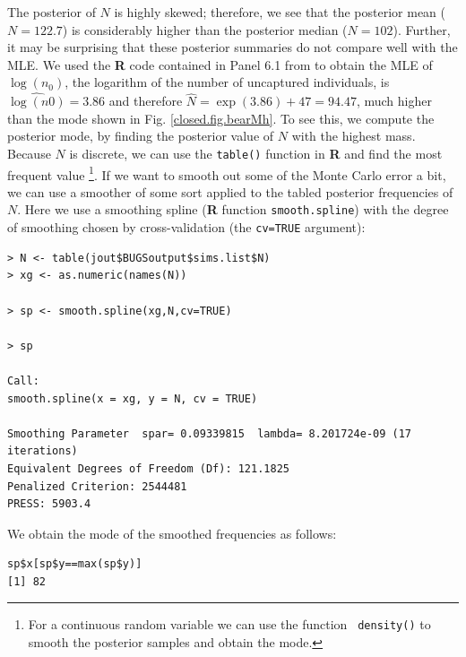 The posterior of $N$ is highly skewed; therefore, we see that the
posterior mean
($N=122.7$) is considerably higher than the posterior median
($N=102$).
Further, it may be surprising that these posterior
summaries do not compare well with the MLE.
We used
the {\bf R} code contained in Panel 6.1 from
\citet{royle_dorazio:2008} to obtain the
MLE of $\log(n_{0})$, the logarithm of the number of uncaptured
individuals, is $\widehat{\log(n0)} = 3.86$ and therefore $\hat{N} =
\exp(3.86)+47 = 94.47$, much higher than the mode
shown in Fig. \ref{closed.fig.bearMh}.
To see this, we compute the posterior mode, by finding
the posterior value of $N$ with the highest mass.
 Because $N$ is discrete, we can  use
the \mbox{\tt table()} function in {\bf R} and find the most frequent value
\footnote{For a continuous random variable we can use the function
 \mbox{\tt
    density()} to smooth the posterior samples and obtain the mode.}.
If we want to smooth out some of the Monte
Carlo error a bit, we can use a smoother of some sort applied to the tabled
posterior frequencies of $N$. Here we use a smoothing spline ({\bf R}
function \mbox{\tt smooth.spline}) with the
degree of smoothing chosen by cross-validation (the \mbox{\tt cv=TRUE}
argument):
{\small
\begin{verbatim}
> N <- table(jout$BUGSoutput$sims.list$N)
> xg <- as.numeric(names(N))

> sp <- smooth.spline(xg,N,cv=TRUE)

> sp

Call:
smooth.spline(x = xg, y = N, cv = TRUE)

Smoothing Parameter  spar= 0.09339815  lambda= 8.201724e-09 (17 iterations)
Equivalent Degrees of Freedom (Df): 121.1825
Penalized Criterion: 2544481
PRESS: 5903.4
\end{verbatim}
}
We obtain the mode of the smoothed frequencies as follows:
\begin{verbatim}
sp$x[sp$y==max(sp$y)]
[1] 82
\end{verbatim}


